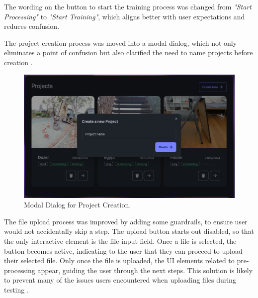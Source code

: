 The wording on the button to start the training process was changed from \emph{"Start Processing"} to \emph{"Start Training"}, which aligns better with user expectations and reduces confusion.


The project creation process was moved into a modal dialog, which not only eliminates a point of confusion but also clarified the need to name projects before creation .

\begin{figure}[htb]
  \centering
	\includegraphics[width=.9\textwidth]{figures/fix-3.png}
	\caption{Modal Dialog for Project Creation.}
  \label{fig:fix-3}
\end{figure}

The file upload process was improved by adding some guardrails, to ensure user would not accidentally skip a step.
The upload button starts out disabled, so that the only interactive element is the file-input field.
Once a file is selected, the button becomes active, indicating to the user that they can proceed to upload their selected file.
Only once the file is uploaded, the UI elements related to pre-processing appear, guiding the user through the next steps.
This solution is likely to prevent many of the issues users encountered when uploading files during testing .


